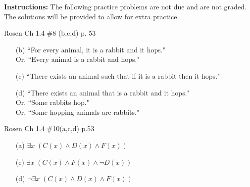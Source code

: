 \documentclass[12pt,addpoints]{exam}
\begin{document}
\extrawidth{0.5in} \extrafootheight{-0in} \pagestyle{headandfoot}
\headrule {} \footrule {}

\noindent \textbf{Instructions:} The following practice problems are
not due and are not graded.  The solutions will be provided to allow
for extra practice.


\begin{questions}
\printanswers

\question Rosen Ch 1.4 \#8 (b,c,d) p. 53
    \ifprintanswers
        \vspace{-10pt}
    \fi
\begin{solution}
    \begin{itemize}[itemsep=0pt,parsep=0pt,topsep=0pt,partopsep=0pt]
        \item[(b)] ``For every animal, it is a rabbit and it hops." \\Or, ``Every animal is a rabbit and hops."
        \item[(c)] ``There exists an animal such that if it is a rabbit then it hops."
        \item[(d)] ``There exists an animal that is a rabbit and it hops." \\Or, ``Some rabbits hop." \\Or, ``Some hopping animals are rabbits."
    \end{itemize}
\end{solution}


\question Rosen Ch 1.4 \#10(a,c,d) p.53
    \ifprintanswers
        \vspace{-10pt}
    \fi
\begin{solution}
    \begin{itemize}[itemsep=0pt,parsep=0pt,topsep=0pt,partopsep=0pt]
        \item[(a)] $\exists x\; (C(x) \wedge D(x) \wedge F(x))$
        \item[(c)] $\exists x\; (C(x) \wedge F(x) \wedge \neg D(x))$
        \item[(d)] $\neg \exists x\; (C(x) \wedge D(x) \wedge F(x))$
    \end{itemize}
\end{solution}



\end{questions}
\end{document}

